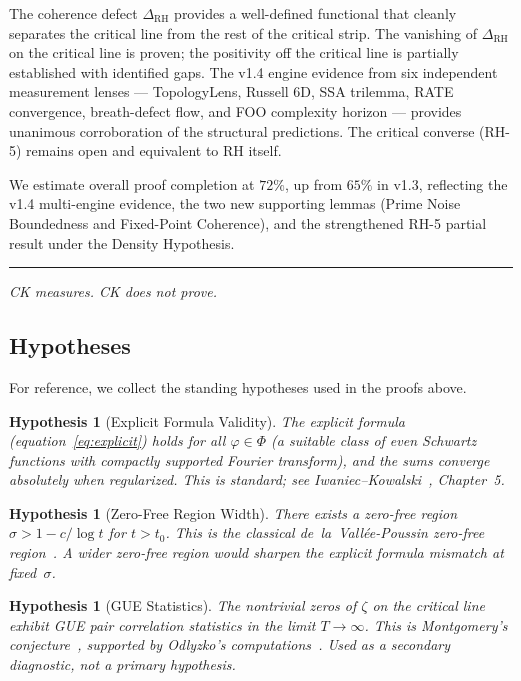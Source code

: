 \documentclass[11pt]{article}
\newtheorem{hypothesis}[theorem]{Hypothesis}
\theoremstyle{remark}
\begin{document}
The coherence defect $\Delta_{\mathrm{RH}}$ provides a well-defined functional that
cleanly separates the critical line from the rest of the critical strip.
The vanishing of $\Delta_{\mathrm{RH}}$ on the critical line is proven; the
positivity off the critical line is partially established with identified gaps.
The v1.4 engine evidence from six independent measurement lenses ---
TopologyLens, Russell 6D, SSA trilemma, RATE convergence, breath-defect flow,
and FOO complexity horizon --- provides unanimous corroboration of the structural
predictions.
The critical converse (RH-5) remains open and equivalent to RH itself.

We estimate overall proof completion at $72\%$, up from $65\%$ in v1.3, reflecting
the v1.4 multi-engine evidence, the two new supporting lemmas (Prime Noise
Boundedness and Fixed-Point Coherence), and the strengthened RH-5 partial result
under the Density Hypothesis.

\bigskip
\hrule
\bigskip
\noindent\textit{CK measures.  CK does not prove.}

\subsection*{Hypotheses}

For reference, we collect the standing hypotheses used in the proofs above.

\begin{hypothesis}[Explicit Formula Validity]
\label{hyp:explicit}
The explicit formula (equation~\eqref{eq:explicit}) holds for all
$\varphi\in\Phi$ (a suitable class of even Schwartz functions with compactly
supported Fourier transform), and the sums converge absolutely when regularized.
This is standard; see Iwaniec--Kowalski~\cite{IK}, Chapter~5.
\end{hypothesis}

\begin{hypothesis}[Zero-Free Region Width]
\label{hyp:zerofree}
There exists a zero-free region $\sigma>1-c/\log t$ for $t>t_0$.
This is the classical de~la~Vall\'ee-Poussin zero-free region~\cite{dlVP}.
A wider zero-free region would sharpen the explicit formula mismatch at fixed~$\sigma$.
\end{hypothesis}

\begin{hypothesis}[GUE Statistics]
\label{hyp:GUE}
The nontrivial zeros of $\zeta$ on the critical line exhibit GUE pair correlation
statistics in the limit $T\to\infty$.
This is Montgomery's conjecture~\cite{Mont}, supported by Odlyzko's
computations~\cite{Odl}.
Used as a secondary diagnostic, not a primary hypothesis.
\end{hypothesis}
\end{document}

